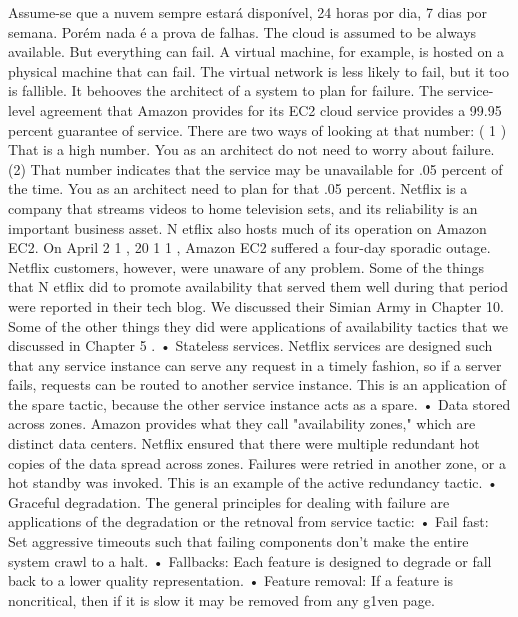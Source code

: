 	Assume-se que a nuvem sempre estará disponível, 24 horas por dia, 7 dias por semana. Porém nada é a prova de falhas. 
The cloud is assumed to be always available. But everything can fail. A virtual machine, for example, is
hosted on a physical machine that can fail. The virtual network is less likely to fail, but it too is fallible.
It behooves the architect of a system to plan for failure.
The service-level agreement that Amazon provides for its EC2 cloud service provides a 99.95
percent guarantee of service. There are two ways of looking at that number: ( 1 ) That is a high number.
You as an architect do not need to worry about failure. (2) That number indicates that the service may
be unavailable for .05 percent of the time. You as an architect need to plan for that .05 percent.
Netflix is a company that streams videos to home television sets, and its reliability is an important
business asset. N etflix also hosts much of its operation on Amazon EC2. On April 2 1 , 20 1 1 , Amazon
EC2 suffered a four-day sporadic outage. Netflix customers, however, were unaware of any problem.
Some of the things that N etflix did to promote availability that served them well during that period
were reported in their tech blog. We discussed their Simian Army in Chapter 10. Some of the other
things they did were applications of availability tactics that we discussed in Chapter 5 .
• Stateless services. Netflix services are designed such that any service instance can serve any
request in a timely fashion, so if a server fails, requests can be routed to another service
instance. This is an application of the spare tactic, because the other service instance acts as a
spare.
• Data stored across zones. Amazon provides what they call "availability zones," which are
distinct data centers. Netflix ensured that there were multiple redundant hot copies of the data
spread across zones. Failures were retried in another zone, or a hot standby was invoked. This
is an example of the active redundancy tactic.
• Graceful degradation. The general principles for dealing with failure are applications of the
degradation or the retnoval from service tactic:
• Fail fast: Set aggressive timeouts such that failing components don't make the entire system
crawl to a halt.
• Fallbacks: Each feature is designed to degrade or fall back to a lower quality representation.
• Feature removal: If a feature is noncritical, then if it is slow it may be removed from any
g1ven page.

\iffalse
\section{Performance}
\section{Segurança}
\fi